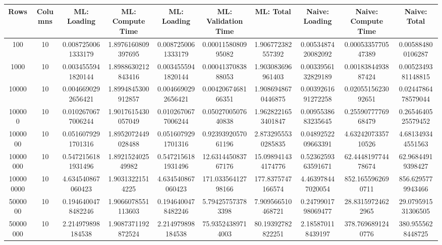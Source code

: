\begin{table}[htb]
    \centering
    \begin{tabular}{@{}cccccccccc@{}}
        \toprule
        Rows & Columns & ML: Loading & ML: Compute Time & ML: Loading & ML: Validation Time & ML: Total & Naive: Loading & Naive: Compute Time & Naive: Total \\
        \midrule
        100 & 10 & 0.0087250061333179 & 1.8976160809397695 & 0.0087250061333179 & 0.0001158080995082 & 1.906772382557392 & 0.0053487420082092 & 0.0005335770547389 & 0.005884800106287 \\
        1000 & 10 & 0.0034555941820144 & 1.8988630212843416 & 0.0034555941820144 & 0.0004137083888053 & 1.903083696961403 & 0.0033956132829189 & 0.0018384493887424 & 0.0052349381148815 \\
        10000 & 10 & 0.0046690292656421 & 1.8994845300912857 & 0.0046690292656421 & 0.0042067468166351 & 1.9086948670446875 & 0.0039261691272258 & 0.0205515623092651 & 0.0244786478579044 \\
        100000 & 10 & 0.0102670677006244 & 1.9017615430057049 & 0.0102670677006244 & 0.0502700507640838 & 1.9628221653401847 & 0.0095538683235645 & 0.2559077776968479 & 0.2654640525579452 \\
        1000000 & 10 & 0.0516079291701316 & 1.8952072449028488 & 0.0516079291701316 & 0.9239392057061196 & 2.8732955530285835 & 0.0489252209663391 & 4.6324207335710526 & 4.681349344551563 \\
        10000000 & 10 & 0.5472156181931496 & 1.892152402549982 & 0.5472156181931496 & 12.631445083767176 & 15.098941434174776 & 0.5236259363591671 & 62.444819774478674 & 62.96844919398427 \\
        100000000 & 10 & 4.634540867060423 & 1.90313221514225 & 4.634540867060423 & 171.03356412798166 & 177.8375747166574 & 4.463978447020054 & 852.1655962690711 & 856.6295779943466 \\
        5000000 & 10 & 0.1946400478482246 & 1.9066078551113603 & 0.1946400478482246 & 5.794257573783398 & 7.909566510468721 & 0.2479901798069477 & 28.83159724622965 & 29.079591531306505 \\
        50000000 & 10 & 2.214979898184538 & 1.9087371192872524 & 2.214979898184538 & 75.93524389714003 & 80.19392782822251 & 2.185870118439197 & 378.7696891240776 & 380.9555628448725 \\
        \bottomrule
    \end{tabular}
\end{table}